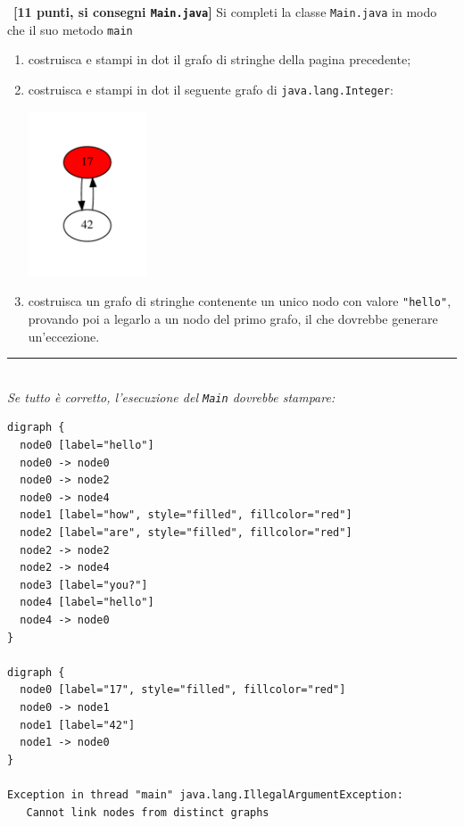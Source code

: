 \documentclass[12pt]{article}
\newcounter{esnu}
\newenvironment{esercizio}{\medskip \noindent {\bf Esercizio\addtocounter{esnu}{1} \arabic{esnu}}}{}
\begin{document}
\begin{esercizio}~\textbf{[11 punti, si consegni \texttt{Main.java}]}
  Si completi la classe \texttt{Main.java} in modo che il suo metodo \texttt{main}
  \begin{enumerate}
  \item costruisca e stampi in dot il grafo di stringhe della pagina precedente;
  \item costruisca e stampi in dot il seguente grafo di \texttt{java.lang.Integer}:
    \begin{center}
      \includegraphics[width=3.5cm]{g2.pdf}
    \end{center}
  \item costruisca un grafo di stringhe contenente un unico nodo con valore
    \texttt{"hello"}, provando poi a legarlo a un nodo del primo grafo, il che
    dovrebbe generare un'eccezione.
  \end{enumerate}
\end{esercizio}
\vspace*{1ex}
\hrule
\mbox{}\\
\emph{Se tutto \`e  corretto, l'esecuzione del \texttt{Main} dovrebbe stampare:}
\begin{verbatim}
digraph {
  node0 [label="hello"]
  node0 -> node0
  node0 -> node2
  node0 -> node4
  node1 [label="how", style="filled", fillcolor="red"]
  node2 [label="are", style="filled", fillcolor="red"]
  node2 -> node2
  node2 -> node4
  node3 [label="you?"]
  node4 [label="hello"]
  node4 -> node0
}

digraph {
  node0 [label="17", style="filled", fillcolor="red"]
  node0 -> node1
  node1 [label="42"]
  node1 -> node0
}

Exception in thread "main" java.lang.IllegalArgumentException:
   Cannot link nodes from distinct graphs
\end{verbatim}
\end{document}
